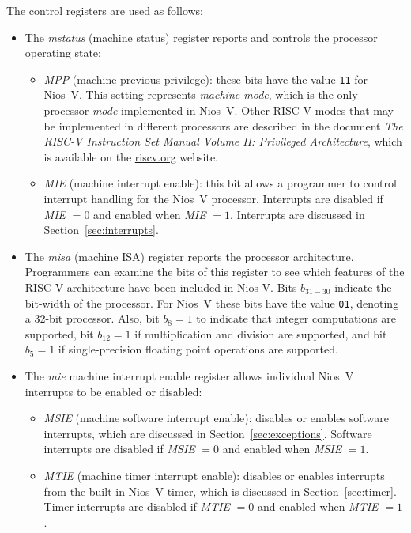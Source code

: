 \documentclass[11pt, twoside, pdftex]{article}
\begin{document}
The control registers are used as follows:
\vspace{-\baselineskip}
\begin{itemize}
\item The {\it mstatus} (machine status) register reports and controls the
processor operating state:
\begin{itemize}
\item {\it MPP} (machine previous privilege): these bits have 
the value \texttt{11} for Nios~V. This setting represents {\it machine mode}, which is
the only processor {\it mode} implemented in Nios~V. Other RISC-V modes that may be
implemented in different processors are described in the document {\it The RISC-V Instruction
Set Manual Volume II: Privileged Architecture}, which is available on the
{\small \href{https://www.riscv.org} {riscv.org}} website. 
\item {\it MIE} (machine interrupt enable): this bit allows a programmer to control
interrupt handling for the Nios~V processor. Interrupts are disabled if 
{\it MIE} $= 0$ and enabled when {\it MIE} $= 1$.  Interrupts are discussed in 
Section~\ref{sec:interrupts}.
\end{itemize}
\item The {\it misa} (machine ISA) register reports the processor architecture.
Programmers can examine the bits of this register to see which features of the RISC-V
architecture have been included in Nios V. Bits $b_{31-30}$ indicate the bit-width of 
the processor. For Nios~V these bits have the value
\texttt{01}, denoting a 32-bit processor. Also, bit $b_8 = 1$ to indicate that integer 
computations are supported, bit $b_{12} = 1$ if multiplication 
and division are supported, and bit $b_{5} = 1$ if single-precision floating point
operations are supported.
\item The {\it mie} {machine interrupt enable} register allows individual Nios~V
interrupts to be enabled or disabled:
\begin{itemize}
\item {\it MSIE} (machine software interrupt enable): disables or enables software
interrupts, which are discussed in Section~\ref{sec:exceptions}. Software interrupts are
disabled if {\it MSIE} $= 0$ and enabled when {\it MSIE} $= 1$.
\item {\it MTIE} (machine timer interrupt enable): disables or enables interrupts from the
built-in Nios~V timer, which is discussed in Section~\ref{sec:timer}. 
Timer interrupts are disabled if {\it MTIE} $= 0$ and enabled when {\it MTIE} $= 1$.


\end{itemize}
\end{itemize}
\end{document}
